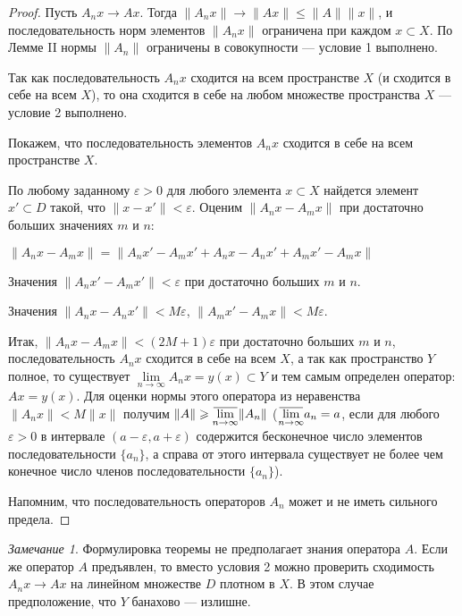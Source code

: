 \documentclass[12pt,a4paper,titlepage,oneside]{book}
\newcommand{\overbar}[1]{\mkern 1.5mu\overline{\mkern-1.5mu#1\mkern-1.5mu}\mkern 1.5mu}
\theoremstyle{definition}
\theoremstyle{plain}
\theoremstyle{remark}
\newtheorem*{remark}{Замечание}
\theoremstyle{remark}
\theoremstyle{remark}
\theoremstyle{remark}
\theoremstyle{plain}
\theoremstyle{plain}
\begin{document}
\begin{proof}
 Пусть $A_n x \to A x$. Тогда $\lVert A_n x\rVert \to \lVert A x\rVert \leqslant \lVert A\rVert \lVert x\rVert$, и последовательность норм элементов $\lVert A_n x\rVert$ ограничена при каждом $x \subset X$. По Лемме II нормы $\lVert A_n\rVert$ ограничены в совокупности --- условие 1 выполнено.

Так как последовательность $A_n x$ сходится на всем пространстве $X$ (и сходится в себе на всем $X$), то она сходится в себе на любом множестве пространства $X$ --- условие 2 выполнено.

 Покажем, что последовательность элементов $A_n x$ сходится в себе на всем пространстве $X$.

По любому заданному $\varepsilon > 0$ для любого элемента $x \subset X$ найдется элемент $x' \subset D$ такой, что $\lVert x - x'\rVert < \varepsilon$. Оценим $\lVert A_n x - A_m x\rVert$ при достаточно больших значениях $m$ и $n$:

\begin{center}
$\lVert A_n x - A_m x\rVert = \lVert A_n x' - A_m x' + A_n x - A_n x' + A_m x' - A_m x\rVert$
\end{center}

Значения $\lVert A_n x' - A_m x'\rVert < \varepsilon$ при достаточно больших $m$ и $n$.

Значения $\lVert A_n x - A_n x'\rVert < M\varepsilon$, $\lVert A_m x' - A_m x\rVert < M\varepsilon$.

Итак, $\lVert A_n x - A_m x\rVert < (2M +1)\varepsilon$ при достаточно больших $m$ и $n$, последовательность $A_n x$ сходится в себе на всем $X$, а так как пространство $Y$ полное, то существует $\lim\limits_{n \to \infty} A_n x = y(x) \subset Y$ и тем самым определен оператор: $A x = y(x)$. Для оценки нормы этого оператора из неравенства $\lVert A_n x\rVert < M\lVert x\rVert$ получим $\lVert A\rVert \geqslant \overbar{\lim\limits_{n \to \infty}}\lVert A_n\rVert$ ($\overbar{\lim\limits_{n \to \infty}}a_n = a$, если для любого $\varepsilon > 0$ в интервале $(a-\varepsilon, a+\varepsilon)$ содержится бесконечное число элементов последовательности $\lbrace a_n\rbrace$, а справа от этого интервала существует не более чем конечное число членов последовательности $\lbrace a_n\rbrace$).

Напомним, что последовательность операторов $A_n$ может и не иметь сильного предела.
\end{proof}

\begin{remark}
Формулировка теоремы не предполагает знания оператора $A$. Если же оператор $A$ предъявлен, то вместо условия 2 можно проверить сходимость $A_n x\to A x$ на линейном множестве $D$ плотном в $X$. В этом случае предположение, что $Y$ банахово --- излишне.
\end{remark}
\end{document}
